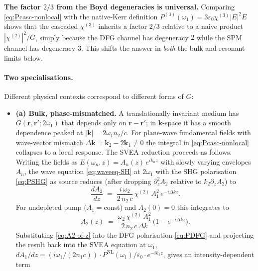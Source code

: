 \documentclass[11pt,a4paper]{article}
\newcommand{\eps}{\varepsilon}
\newcommand{\bvec}[1]{\mathbf{#1}}
\newcommand{\ri}{\bvec{r}}
\newcommand{\chitwo}{\chi^{(2)}}
\newcommand{\chithree}{\chi^{(3)}}
\begin{document}
\textbf{The factor $2/3$ from the Boyd degeneracies is universal.}
Comparing \eqref{eq:Pcasc-nonlocal} with the native-Kerr definition
$P^{(3)}(\omega_1)=3\eps_0\chithree|E|^2 E$ shows that the cascaded
$\chithree$ inherits a factor $2/3$ relative to a naive product
$|\chitwo|^2/G$, simply because the DFG channel has degeneracy $2$
while the SPM channel has degeneracy $3$.  This shifts the answer in
\emph{both} the bulk and resonant limits below.

\paragraph{Two specialisations.}
Different physical contexts correspond to different forms of $G$:
\begin{itemize}\setlength{\itemsep}{3pt}
  \item \textbf{(a) Bulk, phase-mismatched.}  A translationally
    invariant medium has $G(\ri,\ri';2\omega_1)$ that depends only on
    $\ri-\ri'$; in $\mathbf k$-space it has a smooth dependence peaked
    at $|\mathbf k|=2\omega_1 n_2/c$.  For plane-wave fundamental
    fields with wave-vector mismatch
    $\Delta\mathbf k=\mathbf k_2-2\mathbf k_1\neq 0$ the integral in
    \eqref{eq:Pcasc-nonlocal} collapses to a local response.  The
    SVEA reduction \cite{DeSalvo1992,Stegeman1996,Boyd} proceeds as
    follows.  Writing the fields as
    $E(\omega_n,z)=A_n(z)\,e^{i k_n z}$ with slowly varying envelopes
    $A_n$, the wave equation \eqref{eq:waveeq-SH} at $2\omega_1$ with
    the SHG polarisation \eqref{eq:PSHG} as source reduces (after
    dropping $\partial_z^{2}A_2$ relative to $k_2\partial_z A_2$) to
    \cite[\S 2.4]{Boyd}
    \begin{equation}
      \frac{dA_2}{dz}\;=\;\frac{i\,\omega_2}{2\,n_2\,c}\,\chitwo\,A_1^{2}\,
                      e^{-i\Delta k z}.
      \label{eq:SVEA-A2}
    \end{equation}
    For undepleted pump ($A_1=$const) and $A_2(0)=0$ this integrates to
    \begin{equation}
      A_2(z)\;=\;\frac{\omega_2\,\chitwo\,A_1^{2}}{2\,n_2\,c\,\Delta k}\,
                \bigl(1-e^{-i\Delta k z}\bigr).
      \label{eq:A2-of-z}
    \end{equation}
    Substituting \eqref{eq:A2-of-z} into the DFG polarisation
    \eqref{eq:PDFG} and projecting the result back into the SVEA
    equation at $\omega_1$,
    $dA_1/dz=(i\omega_1/(2 n_1 c)) \cdot P^\text{NL}(\omega_1)/\eps_0
    \cdot e^{-i k_1 z}$, gives an intensity-dependent term

\end{itemize}
\end{document}
